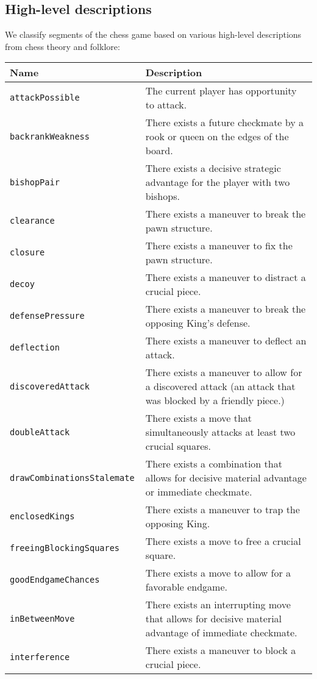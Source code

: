 \documentclass[11pt]{article}
\begin{document}
\subsection{High-level descriptions}
We classify segments of the chess game based on various high-level descriptions from chess theory and folklore:

\begin{table*}
\centering
\begin{tabular}{lp{}}
\hline
\textbf{Name} & \textbf{Description} \\ \hline
\tt{attackPossible} & The current player has opportunity to attack. \\
\tt{backrankWeakness} & There exists a future checkmate by a rook or queen on the edges of the board. \\
\tt{bishopPair} & There exists a decisive strategic advantage for the player with two bishops. \\
\tt{clearance} & There exists a maneuver to break the pawn structure. \\ 
\tt{closure} & There exists a maneuver to fix the pawn structure. \\
\tt{decoy} & There exists a maneuver to distract a crucial piece. \\
\tt{defensePressure} & There exists a maneuver to break the opposing King’s defense. \\
\tt{deflection} & There exists a maneuver to deflect an attack.  \\ 
\tt{discoveredAttack} & There exists a maneuver to allow for a discovered attack (an attack that was blocked by a friendly piece.) \\
\tt{doubleAttack} & There exists a move that simultaneously attacks at least two crucial squares. \\
\tt{drawCombinationsStalemate} & There exists a combination that allows for decisive material advantage or immediate checkmate. \\
\tt{enclosedKings} & There exists a maneuver to trap the opposing King. \\
\tt{freeingBlockingSquares} & There exists a move to free a crucial square. \\
\tt{goodEndgameChances} & There exists a move to allow for a favorable endgame. \\
\tt{inBetweenMove} & There exists an interrupting move that allows for decisive material advantage of immediate checkmate. \\ 
\tt{interference} & There exists a maneuver to block a crucial piece. \\ 

\end{tabular}
\end{table*}
\end{document}
